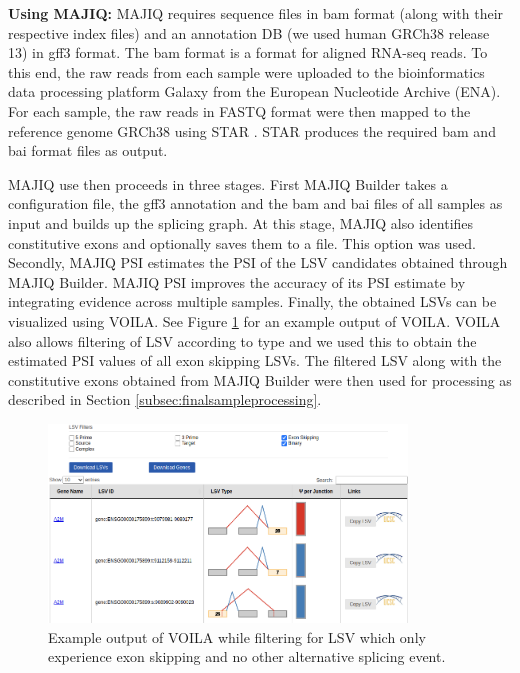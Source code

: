 \textbf{Using MAJIQ:} MAJIQ requires sequence files in bam format (along with their respective index files) and an annotation DB (we used human GRCh38 release 13) in gff3 format. The bam format is a format for aligned RNA-seq reads. 
To this end, the raw reads from each sample were uploaded to the bioinformatics data processing platform Galaxy \cite{galaxy} from the European Nucleotide Archive (ENA). For each sample, the raw reads in FASTQ format were then mapped to the reference genome GRCh38 \cite{hg38} using STAR \cite{star}. STAR produces the required bam and bai format files as output.

MAJIQ use then proceeds in three stages. First MAJIQ Builder takes a configuration file, the gff3 annotation and the bam and bai files of all samples as input and builds up the splicing graph. At this stage, MAJIQ also identifies constitutive exons and optionally saves them to a file. This option was used.
Secondly, MAJIQ PSI estimates the PSI of the LSV candidates obtained through MAJIQ Builder. MAJIQ PSI improves the accuracy of its PSI estimate by integrating evidence across multiple samples.
Finally, the obtained LSVs can be visualized using VOILA. See Figure \ref{fig:voilaexample} for an example output of VOILA. VOILA also allows filtering of LSV according to type and we used this to obtain the estimated PSI values of all exon skipping LSVs. The filtered LSV along with the constitutive exons obtained from MAJIQ Builder were then used for processing as described in Section \ref{subsec:finalsampleprocessing}.\\


\begin{figure}
	\centering\includegraphics[width=0.85\textwidth]{../visualizations/ch4-methods/voila_example.png} 
	\caption[Four-chamber illustration of the human heart.]{Example output of VOILA while filtering for LSV which only experience exon skipping and no other alternative splicing event. }
	\label{fig:voilaexample}
\end{figure}


